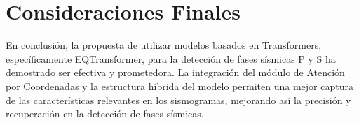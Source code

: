 \section{Consideraciones Finales}

En conclusión, la propuesta de utilizar modelos basados en Transformers, específicamente EQTransformer, para la detección de fases sísmicas P y S ha demostrado ser efectiva y prometedora. La integración del módulo de Atención por Coordenadas y la estructura híbrida del modelo permiten una mejor captura de las características relevantes en los sismogramas, mejorando así la precisión y recuperación en la detección de fases sísmicas.